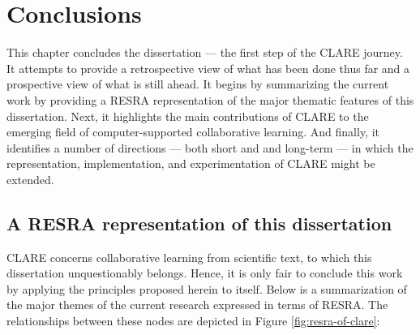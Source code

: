 


\setcounter{chapter}{7}
\chapter{Conclusions}
\label{sec:conclusions}

This chapter concludes the dissertation --- the first step of the CLARE
journey. It attempts to provide a retrospective view of what has been done
thus far and a prospective view of what is still ahead. It begins by
summarizing the current work by providing a RESRA representation of the
major thematic features of this dissertation. Next, it highlights the main
contributions of CLARE to the emerging field of computer-supported
collaborative learning. And finally, it identifies a number of directions
--- both short and and long-term --- in which the representation,
implementation, and experimentation of CLARE might be extended.


\section{A RESRA representation of this dissertation}
\label{sec:c8-summary}

CLARE concerns collaborative learning from scientific text, to which this
dissertation unquestionably belongs. Hence, it is only fair to conclude
this work by applying the principles proposed herein to itself. Below is a
summarization of the major themes of the current research expressed in
terms of RESRA. The relationships between these nodes are depicted in
Figure \ref{fig:resra-of-clare}:


